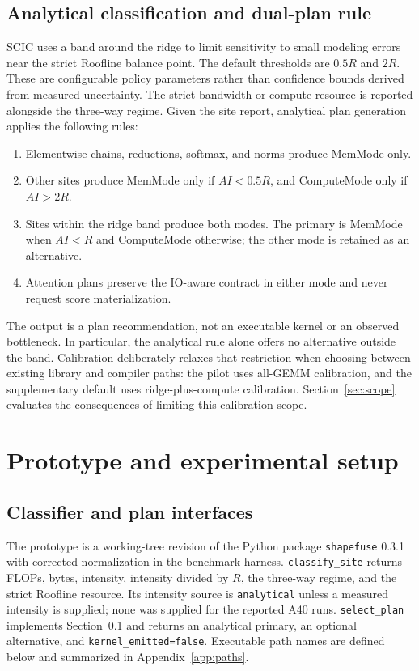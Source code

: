 \documentclass[a4paper,fleqn]{cas-dc}
\begin{document}
\subsection{Analytical classification and dual-plan rule}
\label{sec:selector}

SCIC uses a band around the ridge to limit sensitivity to small modeling errors near the strict Roofline balance point.
The default thresholds are $0.5R$ and $2R$.
These are configurable policy parameters rather than confidence bounds derived from measured uncertainty.
The strict bandwidth or compute resource is reported alongside the three-way regime.
Given the site report, analytical plan generation applies the following rules:
\begin{enumerate}
\item Elementwise chains, reductions, softmax, and norms produce MemMode only.
\item Other sites produce MemMode only if $AI < 0.5R$, and ComputeMode only if $AI > 2R$.
\item Sites within the ridge band produce both modes.
The primary is MemMode when $AI < R$ and ComputeMode otherwise; the other mode is retained as an alternative.
\item Attention plans preserve the IO-aware contract in either mode and never request score materialization.
\end{enumerate}

The output is a plan recommendation, not an executable kernel or an observed bottleneck.
In particular, the analytical rule alone offers no alternative outside the band.
Calibration deliberately relaxes that restriction when choosing between existing library and compiler paths: the pilot uses all-GEMM calibration, and the supplementary default uses ridge-plus-compute calibration.
Section~\ref{sec:scope} evaluates the consequences of limiting this calibration scope.

\section{Prototype and experimental setup}
\label{sec:impl}

\subsection{Classifier and plan interfaces}

The prototype is a working-tree revision of the Python package \texttt{shapefuse} 0.3.1 with corrected normalization in the benchmark harness.
\texttt{classify\_site} returns FLOPs, bytes, intensity, intensity divided by $R$, the three-way regime, and the strict Roofline resource.
Its intensity source is \texttt{analytical} unless a measured intensity is supplied; none was supplied for the reported A40 runs.
\texttt{select\_plan} implements Section~\ref{sec:selector} and returns an analytical primary, an optional alternative, and \texttt{kernel\_emitted=false}.
Executable path names are defined below and summarized in Appendix~\ref{app:paths}.
\end{document}
